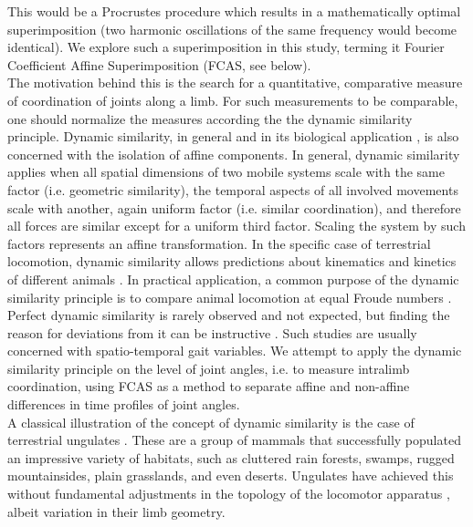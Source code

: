This would be a Procrustes procedure which results in a mathematically optimal superimposition (two harmonic oscillations of the same frequency would become identical).
We explore such a superimposition in this study, terming it Fourier Coefficient Affine Superimposition (FCAS, see below).
\\The motivation behind this is the search for a quantitative, comparative measure of coordination of joints along a limb.
For such measurements to be comparable, one should normalize the measures according the the dynamic similarity principle.
Dynamic similarity, in general and in its biological application \cite[\textit{cf.}][]{Alexander1983,Vaughan2005}, is also concerned with the isolation of affine components.
In general, dynamic similarity applies when all spatial dimensions of two mobile systems scale with the same factor (i.e. geometric similarity), the temporal aspects of all involved movements scale with another, again uniform factor (i.e. similar coordination), and therefore all forces are similar except for a uniform third factor.
Scaling the system by such factors represents an affine transformation.
In the specific case of terrestrial locomotion, dynamic similarity allows predictions about kinematics and kinetics of different animals \cite[i.e. about leg phasing, relative stride length, duty factors, forces and power output;][]{Alexander1983}.
In practical application, a common purpose of the dynamic similarity principle is to compare animal locomotion at equal Froude numbers \cite[e.g.][]{SteudelNumbers2006,Holmes2006}.
Perfect dynamic similarity is rarely observed and not expected, but finding the reason for deviations from it can be instructive \cite[e.g.][]{SteudelNumbers2006,Raichlen2013,Kramer2013}.
Such studies are usually concerned with spatio-temporal gait variables.
We attempt to apply the dynamic similarity principle on the level of joint angles, i.e. to measure intralimb coordination, using FCAS as a method to separate affine and non-affine differences in time profiles of joint angles.
\\A classical illustration of the concept of dynamic similarity is the case of terrestrial ungulates \citep{Alexander1983}.
These are a group of mammals that successfully populated an impressive variety of habitats, such as cluttered rain forests, swamps, rugged mountainsides, plain grasslands, and even deserts.
Ungulates have achieved this without fundamental adjustments in the topology of the locomotor apparatus \citep{McMahon1975,Alexander1984}, albeit variation in their limb geometry.
